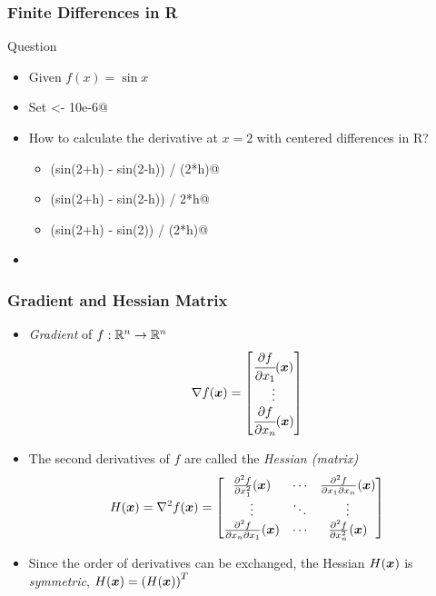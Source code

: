 \documentclass[%
  final,
  11pt, 
  show notes, %
  t, %
  fleqn, %
]{beamer}
\begin{document}
\begin{frame}[fragile]
  \frametitle{Finite Differences in R}
\begin{exampleblock}{Question}
\begin{itemize}
\item Given $f(x) = \sin{x}$
\item Set \verb@h <- 10e-6@
\item How to calculate the derivative at $x = 2$ with centered differences in R?
\begin{itemize}
\item \verb@(sin(2+h) - sin(2-h)) / (2*h)@
\item \verb@(sin(2+h) - sin(2-h)) / 2*h@
\item \verb@(sin(2+h) - sin(2)) / (2*h)@
\end{itemize}
\item \CourseQuiz
\end{itemize}
\end{exampleblock}
%
\end{frame}

\begin{frame}
  \frametitle{Gradient and Hessian Matrix}
\begin{itemize}
\item \emph{Gradient} of $f : \mathbb{R}^n \rightarrow \mathbb{R}^n$
\begin{equation*}
\nabla f(\bm{x}) = 
\begin{bmatrix} \cfrac{\partial f}{\partial x_1}(\bm{x}) \\
\vdots \\
\cfrac{\partial f}{\partial x_n}(\bm{x})
\end{bmatrix}
\end{equation*}
\item The second derivatives of $f$ are called the \emph{Hessian (matrix)}
\begin{equation*}
H(\bm{x}) = \nabla^2 f(\bm{x}) = 
\begin{bmatrix}
\frac{\partial^2 f}{\partial x_1^2}(\bm{x}) & \cdots & \frac{\partial^2 f}{\partial x_1 \partial x_n}(\bm{x}) \\
\vdots & \ddots & \vdots \\
\frac{\partial^2 f}{\partial x_n \partial x_1}(\bm{x}) & \cdots & \frac{\partial^2 f}{\partial x_n^2}(\bm{x})
\end{bmatrix}
\end{equation*}
\item Since the order of derivatives can be exchanged, the Hessian $H(\bm{x})$ is \emph{symmetric}, \ie
$H(\bm{x}) = \left( H(\bm{x}) \right)^T$
\end{itemize}
\end{frame}
\end{document}
